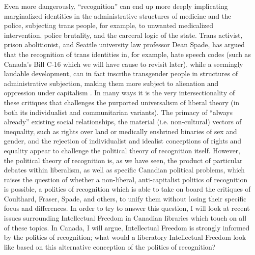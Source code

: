 \documentclass[12pt,oneside]{memoir}
\begin{document}
Even more dangerously, ``recognition'' can end up more deeply implicating marginalized identities in the administrative structures of medicine and the police, subjecting trans people, for example, to unwanted medicalized intervention, police brutality, and the carceral logic of the state. Trans activist, prison abolitionist, and Seattle university law professor Dean Spade, has argued that the recognition of trans identities in, for example, hate speech codes (such as Canada's Bill C-16 which we will have cause to revisit later), while a seemingly laudable development, can in fact inscribe transgender people in structures of administrative subjection, making them more subject to alienation and oppression under capitalism \citep{Spade2015}.
In many ways it is the very intersectionality of these critiques that challenges the purported universalism of liberal theory (in both its individualist and communitarian variants). The primacy of ``always already'' existing social relationships, the material (i.e. non-cultural) vectors of inequality, such as rights over land or medically enshrined binaries of sex and gender, and the rejection of individualist and idealist conceptions of rights and equality appear to challenge the political theory of recognition itself. However, the political theory of recognition is, as we have seen, the product of particular debates within liberalism, as well as specific Canadian political problems, which raises the question of whether a non-liberal, anti-capitalist politics of recognition is possible, a politics of recognition which is able to take on board the critiques of Coulthard, Fraser, Spade, and others, to unify them without losing their specific focus and differences. In order to try to answer this question, I will look at recent issues surrounding Intellectual Freedom in Canadian libraries which touch on all of these topics. In Canada, I will argue, Intellectual Freedom is strongly informed by the politics of recognition; what would a liberatory Intellectual Freedom look like based on this alternative conception of the politics of recognition?



\backmatter

 

\end{document}
